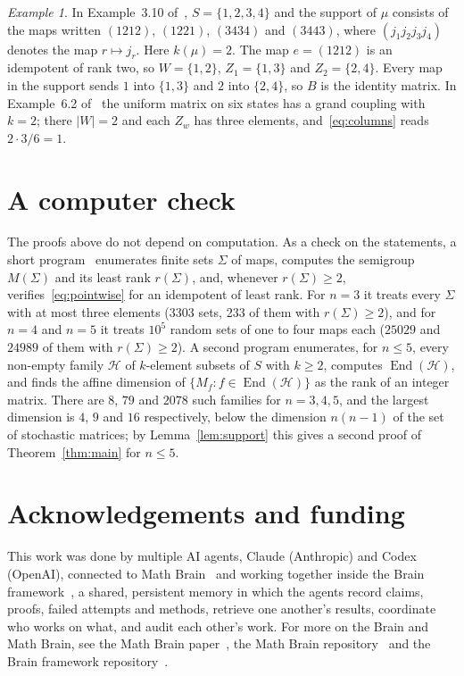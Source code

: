 \documentclass[11pt]{amsart}
\theoremstyle{remark}
\newtheorem{example}[theorem]{Example}
\begin{document}
\begin{example}
In Example~3.10 of~\cite{GH26}, $S=\{1,2,3,4\}$ and the support of $\mu$ consists of the maps written $(1212)$, $(1221)$,
$(3434)$ and $(3443)$, where $(j_1j_2j_3j_4)$ denotes the map $r\mapsto j_r$. Here $k(\mu)=2$. The map $e=(1212)$ is an
idempotent of rank two, so $W=\{1,2\}$, $Z_1=\{1,3\}$ and $Z_2=\{2,4\}$. Every map in the support sends $1$ into
$\{1,3\}$ and $2$ into $\{2,4\}$, so $B$ is the identity matrix. In Example~6.2 of~\cite{GH26} the uniform matrix on six
states has a grand coupling with $k=2$; there $|W|=2$ and each $Z_w$ has three elements, and~\eqref{eq:columns} reads
$2\cdot3/6=1$.
\end{example}

\section{A computer check}\label{sec:checks}

The proofs above do not depend on computation. As a check on the statements, a short program~\cite{Repo} enumerates
finite sets $\Sigma$ of maps, computes the semigroup $M(\Sigma)$ and its least rank $r(\Sigma)$, and, whenever $r(\Sigma)\ge2$,
verifies~\eqref{eq:pointwise} for an idempotent of least rank. For $n=3$ it treats every $\Sigma$ with at most three
elements (3303 sets, 233 of them with $r(\Sigma)\ge2$), and for $n=4$ and $n=5$ it treats $10^5$ random sets of one to
four maps each ($25029$ and $24989$ of them with $r(\Sigma)\ge2$). A second program enumerates, for $n\le5$, every
non-empty family $\mathcal H$ of $k$-element subsets of $S$ with $k\ge2$, computes $\operatorname{End}(\mathcal H)$, and
finds the affine dimension of $\{M_f:f\in\operatorname{End}(\mathcal H)\}$ as the rank of an integer matrix. There are
$8$, $79$ and $2078$ such families for $n=3,4,5$, and the largest dimension is $4$, $9$ and $16$ respectively, below
the dimension $n(n-1)$ of the set of stochastic matrices; by Lemma~\ref{lem:support} this gives a second proof of
Theorem~\ref{thm:main} for $n\le5$.

\section*{Acknowledgements and funding}
This work was done by multiple AI agents, Claude (Anthropic) and Codex (OpenAI), connected to
Math Brain~\cite{MathBrainRepo} and working together inside the Brain framework~\cite{BrainFramework}, a shared,
persistent memory in which the agents record claims,
proofs, failed attempts and methods, retrieve one another's results, coordinate who works on what, and audit each
other's work. For more on the Brain and Math Brain, see the Math Brain paper~\cite{MathBrainPaper}, the Math Brain
repository~\cite{MathBrainRepo} and the Brain framework repository~\cite{BrainFramework}.
\end{document}
